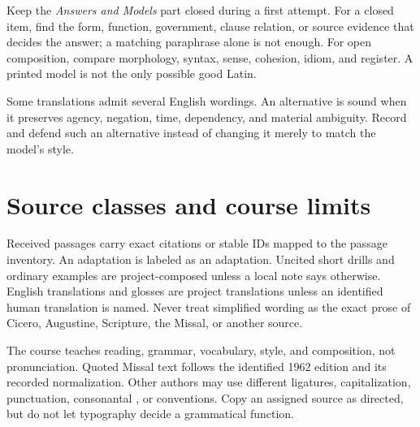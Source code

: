 Keep the \emph{Answers and Models} part closed during a first attempt. For a
closed item, find the form, function, government, clause relation, or source
evidence that decides the answer; a matching paraphrase alone is not enough.
For open composition, compare morphology, syntax, sense, cohesion, idiom, and
register. A printed model is not the only possible good Latin.

Some translations admit several English wordings. An alternative is sound
when it preserves agency, negation, time, dependency, and material ambiguity.
Record and defend such an alternative instead of changing it merely to match
the model's style.

\section{Source classes and course limits}

Received passages carry exact citations or stable IDs mapped to the passage
inventory. An adaptation is labeled as an adaptation. Uncited short drills and
ordinary examples are project-composed unless a local note says otherwise.
English translations and glosses are project translations unless an
identified human translation is named. Never treat simplified wording as the
exact prose of Cicero, Augustine, Scripture, the Missal, or another source.

The course teaches reading, grammar, vocabulary, style, and composition, not
pronunciation. Quoted Missal text follows the identified 1962 edition and its
recorded normalization. Other authors may use different ligatures,
capitalization, punctuation, consonantal , or 
conventions. Copy an assigned source as directed, but do not let typography
decide a grammatical function.
